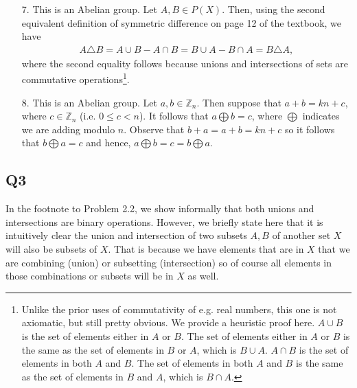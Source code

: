 \documentclass[12pt]{article}
\def\Z{{\mathbb Z}}        %
\numberwithin{theorem}{section}
\numberwithin{equation}{section}
\numberwithin{remark}{section}
\numberwithin{definition}{section}
\numberwithin{theorem}{section}
\numberwithin{lemma}{section}
\numberwithin{example}{section}
\begin{document}
\begin{itemize}
{\begin{itemize}
{				\begin{align*}
					(f+g)(x)=f(x)+g(x)=g(x)+f(x)=(g+f)(x),
				\end{align*}
			where the second equality follows because addition of real numbers is commutative.}
			\item[7.]{This is an Abelian group. Let $A,B\in P(X)$. Then, using the second equivalent definition of symmetric difference on page 12 of the textbook, we have
				\begin{align*}
					A\triangle B = A\cup B - A \cap B = B\cup A - B\cap A = B\triangle A,
				\end{align*}
			where the second equality follows because unions and intersections of sets are commutative operations\footnote{Unlike the prior uses of commutativity of e.g. real numbers, this one is not axiomatic, but still pretty obvious. We provide a heuristic proof here. $A\cup B$ is the set of elements either in $A$ or $B$. The set of elements either in $A$ or $B$ is the same as the set of elements in $B$ or $A$, which is $B\cup A$. $A\cap B$ is the set of elements in both $A$ and $B$. The set of elements in both $A$ and $B$ is the same as the set of elements in $B$ and $A$, which is $B\cap A$.}.}
			\item[8.]{This is an Abelian group. Let $a,b\in\Z_n$. Then suppose that $a+b=kn+c$, where $c\in\Z_n$ (i.e. $0\le c < n$). It follows that $a\bigoplus b = c$, where $\bigoplus$ indicates we are adding modulo $n$. Observe that $b+a=a+b=kn+c$ so it follows that $b\bigoplus a = c$ and hence, $a\bigoplus b=c=b\bigoplus a$.}
		\end{itemize}}
\end{itemize}



\subsection{Q3}

In the footnote to Problem 2.2, we show informally that both unions and intersections are binary operations. However, we briefly state here that it is intuitively clear the union and intersection of two subsets $A,B$ of another set $X$ will also be subsets of $X$. That is because we have elements that are in $X$ that we are combining (union) or subsetting (intersection) so of course all elements in those combinations or subsets will be in $X$ as well. 
\end{document}
